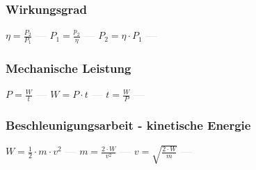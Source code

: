 \subsubsection{Wirkungsgrad} 
\begin{minipage}{0.45\textwidth} 
\end{minipage} 
\begin{minipage}{0.45\textwidth} 
 
\end{minipage} 
$ \eta  = \frac{P_{2} }{P_{1} } $ \textcolor{lightgray}{\textbf{---}} 
$ P_{1}  = \frac{p_{2} }{\eta } $ \textcolor{lightgray}{\textbf{---}} 
$ P_{2}  = \eta \cdot P_{1} $ \textcolor{lightgray}{\textbf{---}} 

\subsubsection{Mechanische Leistung} 
\begin{minipage}{0.45\textwidth} 
\end{minipage} 
\begin{minipage}{0.45\textwidth} 
 
\end{minipage} 
$ P = \frac{W}{t} $ \textcolor{lightgray}{\textbf{---}} 
$ W = P\cdot t $ \textcolor{lightgray}{\textbf{---}} 
$ t = \frac{W}{P} $ \textcolor{lightgray}{\textbf{---}} 

\subsubsection{Beschleunigungsarbeit - kinetische Energie} 
\begin{minipage}{0.45\textwidth} 
\end{minipage} 
\begin{minipage}{0.45\textwidth} 
 
\end{minipage} 
$ W = \frac{1}{2}\cdot m\cdot v^{2} $ \textcolor{lightgray}{\textbf{---}} 
$ m = \frac{2\cdot W}{ v^{2} } $ \textcolor{lightgray}{\textbf{---}} 
$ v = \sqrt{\frac{2\cdot W}{ m}} $ \textcolor{lightgray}{\textbf{---}} 

